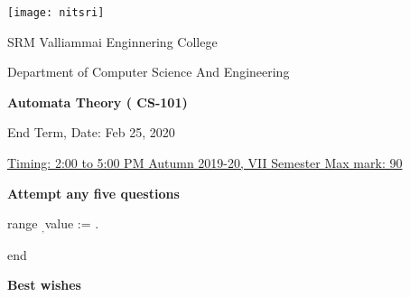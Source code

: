 \documentclass[12pt, a4paper]{exam}
\begin{document}
	\noindent
	\begin{minipage}[l]{0.1\textwidth}
		\noindent
		\texttt{[image: nitsri]}
	\end{minipage}
\hfill
\begin{minipage}[c]{0.8\textwidth}
	\begin{center}
		{\large	SRM Valliammai Enginnering College \par
		\large	Department of Computer Science And Engineering	\par
	\large \textbf{Automata Theory ( CS-101)}	\par
\small	End Term, Date: Feb 25, 2020}
	\end{center}
\end{minipage}
\par
\vspace{0.2in}
\noindent
\uline{Timing: 2:00 to 5:00 PM	\hfill Autumn 2019-20, VII Semester		\hfill Max mark: 90}
\par 
\vspace{0.15in}
\noindent
\centering
{\small \bfseries 	Attempt any five questions }

\begin{questions}
    {{range $_, $value := .}}
    \pointsdroppedatright
	\question
\vspace{0.2in}
{{ end }}
\end{questions}
\vspace{0.75in}
{\large \bfseries Best wishes}
\end{document}
